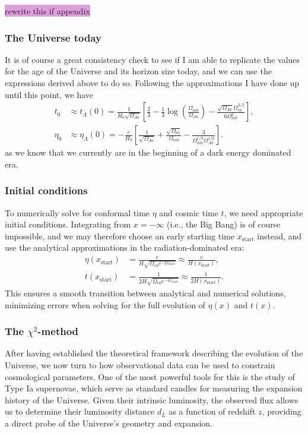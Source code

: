 \documentclass{aa}
\begin{document}
\colorbox{Plum}{rewrite this if appendix}


\subsubsection{The Universe today}
It is of course a great consistency check to see if I am able to replicate the values for the age of the Universe and its horizon size today, and we can use the expressions derived above to do so. Following the approximations I have done up until this point, we have
\begin{align}
  t_0 &\approx t_{\Lambda}(0) = \frac{1}{H_0\sqrt{\Omega_{\Lambda0}}}\left[\frac{2}{3}-\frac{1}{3}\log\left(\frac{\Omega_{m0}}{\Omega_{\Lambda0}}\right)-\frac{\sqrt{\Omega_{\Lambda0}}\Omega_{r0}^{3/2}}{6\Omega^2_{m0}}\right],
  \\
  \eta_0 &\approx \eta_\Lambda(0) = -\frac{c}{H_0}\left[\frac{1}{\sqrt{\Omega_{\Lambda0}}} +\frac{\sqrt{\Omega_{r0}}}{\Omega_{m0}} - \frac{3}{\Omega_{m0}^{1/3}\Omega_{\Lambda0}^{1/6}} \right].
\end{align}
as we know that we currently are in the beginning of a dark energy dominated era.


\subsubsection{Initial conditions}
To numerically solve for conformal time $\eta$ and cosmic time $t$, we need appropriate initial conditions. Integrating from $x = -\infty$ (i.e., the Big Bang) is of course impossible, and we may therefore choose an early starting time $x_{\text{start}}$ instead, and use the analytical approximations in the radiation-dominated era:
\begin{align}
  \eta(x_{\text{start}}) &= \frac{c}{H\sqrt{\Omega_{r0}e^{-2x_\text{start}}}} \approx \frac{c}{H(x_{\text{start}})},
  \\
  t(x_{\text{start}}) &= \frac{1}{2H\sqrt{\Omega_{r0}e^{-4x_\text{start}}}} \approx \frac{1}{2H(x_{\text{start}})}.
\end{align}
This ensures a smooth transition between analytical and numerical solutions, minimizing errors when solving for the full evolution of $\eta(x)$ and $t(x)$.


\subsubsection{The \texorpdfstring{$\chi^2$}{Lg}-method}
After having established the theoretical framework describing the evolution of the Universe, we now turn to how observational data can be used to constrain cosmological parameters. One of the most powerful tools for this is the study of Type Ia supernovae, which serve as standard candles for measuring the expansion history of the Universe. Given their intrinsic luminosity, the observed flux allows us to determine their luminosity distance $d_L$ as a function of redshift $z$, providing a direct probe of the Universe's geometry and expansion.
\end{document}
